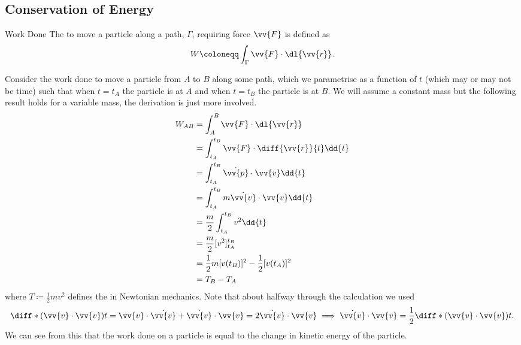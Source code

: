 \documentclass[fleqn]{NotesClass}
\begin{document}
    \subsection{Conservation of Energy}
    \begin{dfn}{Work Done}{}
        The  to move a particle along a path, \(\Gamma\), requiring force \(\vv{F}\) is defined as
        \begin{equation}
            W\coloneqq \int_\Gamma \vv{F}\cdot\dl{\vv{r}}.
        \end{equation}
    \end{dfn}
    
    Consider the work done to move a particle from \(A\) to \(B\) along some path, which we parametrise as a function of \(t\) (which may or may not be time) such that when \(t = t_A\) the particle is at \(A\) and when \(t = t_B\) the particle is at \(B\).
    We will assume a constant mass but the following result holds for a variable mass, the derivation is just more involved.
    \begin{align}
        W_{AB} &= \int_A^B \vv{F}\cdot\dl{\vv{r}}\\
        &= \int_{t_A}^{t_B} \vv{F} \cdot\diff{\vv{r}}{t}\dd{t}\\
        &= \int_{t_A}^{t_B} \dot{\vv{p}}\cdot\vv{v}\dd{t}\\
        &= \int_{t_A}^{t_B} m\dot{\vv{v}}\cdot\vv{v}\dd{t}\\
        &= \frac{m}{2}\int_{t_A}^{t_B} v^2 \dd{t}\\
        &= \frac{m}{2}[v^2]_{t_A}^{t_B}\\
        &= \frac{1}{2}m[v(t_B)]^2 - \frac{1}{2}[v(t_A)]^2\\
        &= T_{B} - T_{A}\label{eqn:W=Tb-Ta}
    \end{align}
    where \(T\coloneqq \frac{1}{2}mv^2\) defines the  in Newtonian mechanics.
    Note that about halfway through the calculation we used
    \begin{equation}
        \diff*{(\vv{v}\cdot\vv{v})}{t} = \vv{v}\cdot\dot{\vv{v}} + \dot{\vv{v}}\cdot\vv{v} = 2\dot{\vv{v}}\cdot\vv{v} \implies \dot{\vv{v}}\cdot\vv{v} = \frac{1}{2}\diff*{(\vv{v}\cdot\vv{v})}{t}.
    \end{equation}
    We can see from this that the work done on a particle is equal to the change in kinetic energy of the particle.
    
\end{document}
